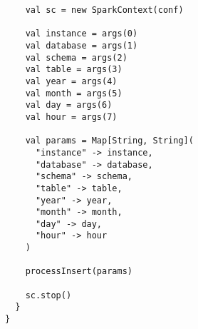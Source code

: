 \documentclass[12pt, oneside, a4paper, brazil]{abntex2}
\begin{document}
\begin{apendicesenv}
\begin{lstlisting}
    val sc = new SparkContext(conf)

    val instance = args(0)
    val database = args(1)
    val schema = args(2)
    val table = args(3)
    val year = args(4)
    val month = args(5)
    val day = args(6)
    val hour = args(7)

    val params = Map[String, String](
      "instance" -> instance,
      "database" -> database,
      "schema" -> schema,
      "table" -> table,
      "year" -> year,
      "month" -> month,
      "day" -> day,
      "hour" -> hour
    )

    processInsert(params)

    sc.stop()
  }
}

\end{lstlisting}

\end{apendicesenv}
\end{document}
